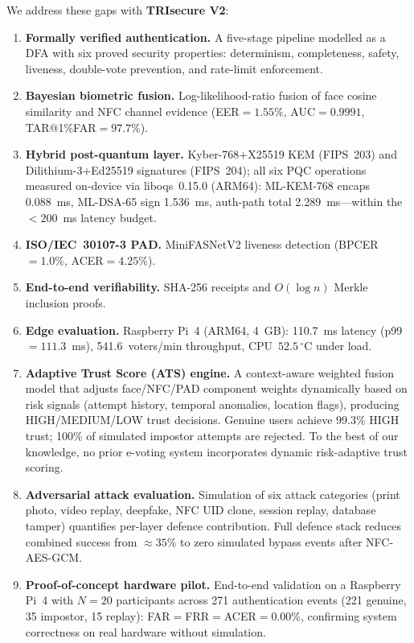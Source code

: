 \documentclass[conference]{IEEEtran}
\begin{document}
We address these gaps with \textbf{TRIsecure V2}:

\begin{enumerate}[label=\textbf{C\arabic*.},leftmargin=*]
  \item \textbf{Formally verified authentication.} A five-stage pipeline
        modelled as a DFA with six proved security properties: determinism,
        completeness, safety, liveness, double-vote prevention, and
        rate-limit enforcement.
  \item \textbf{Bayesian biometric fusion.} Log-likelihood-ratio fusion of
        face cosine similarity and NFC channel evidence (EER\(=1.55\%\),
        AUC\(=0.9991\), TAR@1\%FAR\(=97.7\%\)).
  \item \textbf{Hybrid post-quantum layer.} Kyber-768\(+\)X25519 KEM (FIPS~203)
        and Dilithium-3\(+\)Ed25519 signatures (FIPS~204); all six PQC
        operations measured on-device via liboqs~0.15.0 (ARM64):
        ML-KEM-768 encaps 0.088~ms, ML-DSA-65 sign 1.536~ms,
        auth-path total 2.289~ms—within the \(<200\)~ms latency budget.
  \item \textbf{ISO/IEC~30107-3 PAD.} MiniFASNetV2 liveness detection
        (BPCER\(=1.0\%\), ACER\(=4.25\%\)).
  \item \textbf{End-to-end verifiability.} SHA-256 receipts and \(O(\log n)\)
        Merkle inclusion proofs.
  \item \textbf{Edge evaluation.} Raspberry Pi~4 (ARM64, 4~GB): 110.7~ms
        latency (p99\(=111.3\)~ms), 541.6~voters/min throughput,
        CPU~\(52.5\,^\circ\)C under load.
  \item \textbf{Adaptive Trust Score (ATS) engine.} A context-aware
        weighted fusion model that adjusts face/NFC/PAD component weights
        dynamically based on risk signals (attempt history, temporal
        anomalies, location flags), producing HIGH/MEDIUM/LOW trust
        decisions. Genuine users achieve 99.3\% HIGH trust; 100\% of
        simulated impostor attempts are rejected. To the best of our knowledge,
        no prior e-voting system incorporates dynamic risk-adaptive trust scoring.
  \item \textbf{Adversarial attack evaluation.} Simulation of six attack
        categories (print photo, video replay, deepfake, NFC UID clone,
        session replay, database tamper) quantifies per-layer defence
        contribution. Full defence stack reduces combined success from
        \(\approx35\%\) to zero simulated bypass events after NFC-AES-GCM.
  \item \textbf{Proof-of-concept hardware pilot.} End-to-end validation
        on a Raspberry Pi~4 with \(N{=}20\) participants across 271
        authentication events (221 genuine, 35 impostor, 15 replay):
        FAR\(=\)FRR\(=\)ACER\(=0.00\%\), confirming system correctness
        on real hardware without simulation.
\end{enumerate}
\end{document}

